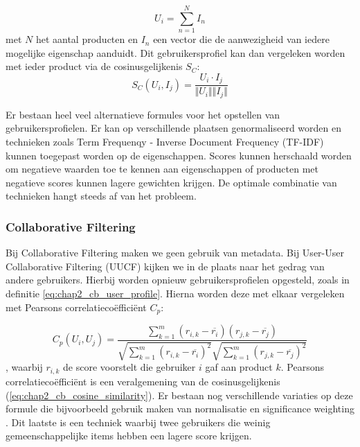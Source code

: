 \begin{equation}
    U_i = \sum_{n=1}^{N} I_n
    \label{eq:chap2_cb_user_profile}
\end{equation}
met $N$ het aantal producten en $I_n$ een vector die de aanwezigheid van iedere mogelijke eigenschap aanduidt. Dit gebruikersprofiel kan dan vergeleken worden met ieder product via de cosinusgelijkenis $S_C$:
\begin{equation}
    S_C(U_i, I_j) = \frac{U_i \cdot I_j}{\Vert U_i \Vert \Vert I_j \Vert}
    \label{eq:chap2_cb_cosine_similarity}
\end{equation}

Er bestaan heel veel alternatieve formules voor het opstellen van gebruikersprofielen. Er kan op verschillende plaatsen genormaliseerd worden en technieken zoals Term Frequenqy - Inverse Document Frequency (TF-IDF) kunnen toegepast worden op de eigenschappen. Scores kunnen herschaald worden om negatieve waarden toe te kennen aan eigenschappen of producten met negatieve scores kunnen lagere gewichten krijgen. De optimale combinatie van technieken hangt steeds af van het probleem.

\subsubsection{Collaborative Filtering}
\label{sec:chapt2_cf}
Bij Collaborative Filtering maken we geen gebruik van metadata. Bij User-User Collaborative Filtering (UUCF) kijken we in de plaats naar het gedrag van andere gebruikers. Hierbij worden opnieuw gebruikersprofielen opgesteld, zoals in definitie \ref{eq:chap2_cb_user_profile}. Hierna worden deze met elkaar vergeleken met Pearsons correlatiecoëfficiënt $C_p$:

\begin{equation}
    C_p(U_i, U_j) = \frac{\sum_{k = 1}^{m}(r_{i, k} - \overline{r_i})(r_{j, k} - \overline{r_j})}{\sqrt{\sum_{k = 1}^{m}(r_{i, k} - \overline{r_i})^2} \sqrt{\sum_{k = 1}^{m}(r_{j, k} - \overline{r_j})^2}}
    \label{eq:chapt2_pearson_corr}
\end{equation}
\cite{UUCF_original_paper}, waarbij $r_{i, k}$ de score voorstelt die gebruiker $i$ gaf aan product $k$.
Pearsons correlatiecoëfficiënt is een veralgemening van de cosinusgelijkenis (\ref{eq:chap2_cb_cosine_similarity}). Er bestaan nog verschillende variaties \cite{UUCF_alternative_implementations} op deze formule die bijvoorbeeld gebruik maken van normalisatie en significance weighting \cite{CF_significance_weighting}. Dit laatste is een techniek waarbij twee gebruikers die weinig gemeenschappelijke items hebben een lagere score krijgen.

